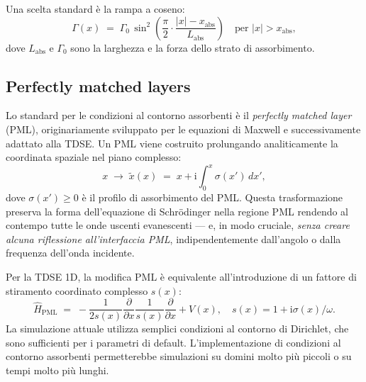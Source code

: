\documentclass[12pt, a4paper]{article}
\newcommand{\ii}{\mathrm{i}}          %
\newcommand{\Htop}{\hat{H}}
\begin{document}
Una scelta standard è la rampa a coseno:
\begin{equation}
  \Gamma(x) \;=\;
  \Gamma_0\,\sin^2\!\left(\frac{\pi}{2}
  \cdot\frac{|x|-x_\text{abs}}{L_\text{abs}}\right)
  \quad \text{per } |x| > x_\text{abs},
\end{equation}
dove $L_\text{abs}$ e $\Gamma_0$ sono la larghezza e la forza dello strato
di assorbimento.

\subsection{Perfectly matched layers}

Lo standard per le condizioni al contorno assorbenti è il \emph{perfectly
matched layer} (PML), originariamente sviluppato per le equazioni di Maxwell
\cite{NumericalRecipes} e successivamente adattato alla TDSE. Un PML viene
costruito prolungando analiticamente la coordinata spaziale nel piano
complesso:
\begin{equation}
  x \;\to\; \tilde{x}(x) \;=\; x + \ii\int_0^x \sigma(x')\,dx',
\end{equation}
dove $\sigma(x') \geq 0$ è il profilo di assorbimento del PML. Questa
trasformazione preserva la forma dell'equazione di Schr\"{o}dinger nella
regione PML rendendo al contempo tutte le onde uscenti evanescenti — e,
in modo cruciale, \emph{senza creare alcuna riflessione all'interfaccia PML},
indipendentemente dall'angolo o dalla frequenza dell'onda incidente.

Per la TDSE 1D, la modifica PML è equivalente all'introduzione di un
fattore di stiramento coordinato complesso $s(x)$:
\begin{equation}
  \Htop_\text{PML} \;=\;
  -\frac{1}{2s(x)}\frac{\partial}{\partial x}\frac{1}{s(x)}\frac{\partial}{\partial x}
  + V(x),
  \quad s(x) = 1 + \ii\sigma(x)/\omega.
\end{equation}
La simulazione attuale utilizza semplici condizioni al contorno di Dirichlet,
che sono sufficienti per i parametri di default. L'implementazione di
condizioni al contorno assorbenti permetterebbe simulazioni su domini molto
più piccoli o su tempi molto più lunghi.
\end{document}

